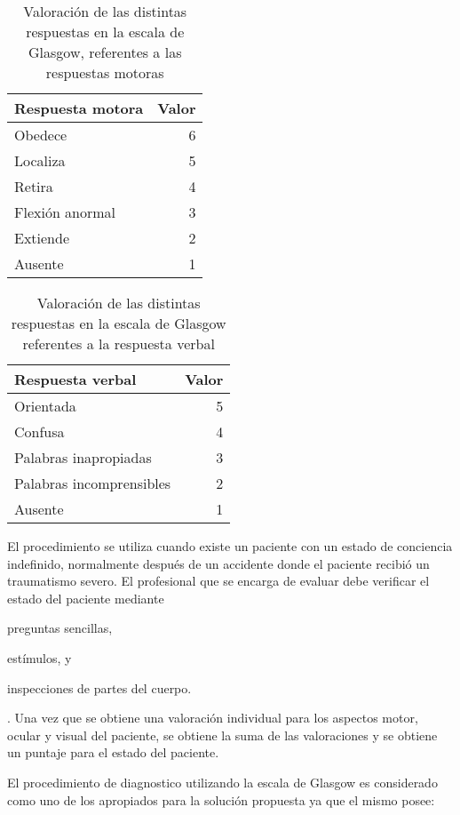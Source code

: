 \begin{table}[!hbt]
\centering
\begin{tabular}{lr}
\toprule
\textbf{Respuesta motora} & \textbf{Valor} \\
\midrule
Obedece & 6 \\
Localiza & 5 \\
Retira & 4 \\
Flexión anormal & 3 \\
Extiende & 2 \\
Ausente & 1 \\
\bottomrule
\end{tabular}
\caption{Valoración de las distintas respuestas en la escala de Glasgow,
    referentes a las respuestas motoras}
\label{tab:seleccion_glasgow_respuestas_motor}
\end{table}

\begin{table}[!hbt]
\centering
\begin{tabular}{lr}
\toprule
\textbf{Respuesta verbal} & \textbf{Valor} \\
\midrule
Orientada & 5 \\
Confusa & 4 \\
Palabras inapropiadas & 3 \\
Palabras incomprensibles & 2 \\
Ausente & 1 \\
\bottomrule
\end{tabular}
\caption{Valoración de las distintas respuestas en la escala de Glasgow
    referentes a la respuesta verbal}
\label{tab:seleccion_glasgow_respuestas_verbal}
\end{table}

El procedimiento se utiliza cuando existe un paciente con un estado de
conciencia indefinido, normalmente después de un accidente donde el paciente
recibió un traumatismo severo. El profesional que se encarga de evaluar debe
verificar el estado del paciente mediante
\begin{enumerate*}
\item preguntas sencillas,
\item estímulos, y
\item inspecciones de partes del cuerpo.
\end{enumerate*}. 
Una vez que se obtiene una valoración individual para los aspectos
motor, ocular y visual del paciente, se obtiene la suma de las valoraciones y se
obtiene un puntaje para el estado del paciente.

El procedimiento de diagnostico utilizando la escala de Glasgow es considerado
como uno de los apropiados para la solución propuesta ya que el mismo posee:

